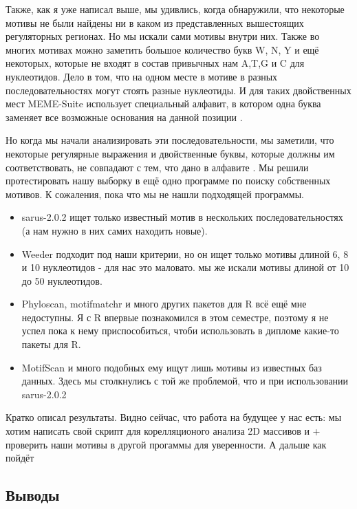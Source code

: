 \documentclass[14pt]{extarticle}
\begin{document}
    \par{Также, как я уже написал выше, мы удивлись, когда обнаружили, что некоторые мотивы не были найдены ни в каком 
    из представленных вышестоящих регуляторных регионах. Но мы искали сами мотивы внутри них. Также во многих мотивах 
    можно заметить большое количество букв W, N, Y и ещё некоторых, которые не входят в состав привычных нам A,T,G и C 
    для нуклеотидов. Дело в том, что на одном месте в мотиве в разных последовательностях могут стоять разные 
    нуклеотиды. И для таких двойственных мест MEME-Suite использует специальный алфавит, в котором одна буква заменяет 
    все возможные основания на данной позиции \cite{memealphabet}. }
    
    \par{Но когда мы начали анализировать эти последовательности, мы заметили, что некоторые регулярные выражения и 
    двойственные буквы, которые должны им соответствовать, не совпадают с тем, что дано в алфавите \cite{memealphabet}. 
    Мы решили протестировать нашу выборку в ещё одно программе по поиску собственных мотивов. К сожаления, пока что мы 
    не нашли подходящей программы.
    \begin{itemize}
        \item sarus-2.0.2 ищет только известный мотив в нескольких последовательностях (а нам нужно в них самих находить
        новые). 
        \item Weeder подходит под наши критерии, но он ищет только мотивы длиной 6, 8 и 10 нуклеотидов - для нас это 
        маловато. мы же искали мотивы длиной от 10 до 50 нуклеотидов.
        \item Phyloscan, motifmatchr и много других пакетов для R всё ещё мне недоступны. Я с R впервые познакомился в 
        этом семестре, поэтому я не успел пока к нему приспособиться, чтоби использовать в дипломе какие-то пакеты для 
        R.
        \item MotifScan и много подобных ему ищут лишь мотивы из известных баз данных. Здесь мы столкнулись с той же 
        проблемой, что и при использовании sarus-2.0.2
    \end{itemize}
    }
    
    \par{Кратко описал результаты. Видно сейчас, что работа на будущее у нас есть: мы хотим написать свой скрипт для 
    корелляционого анализа 2D массивов и + проверить наши мотивы в другой прогаммы для уверенности. А дальше как пойдёт}
    
\newpage
\begin{center}
\item \section{Выводы}
\end{center}
\end{document}
